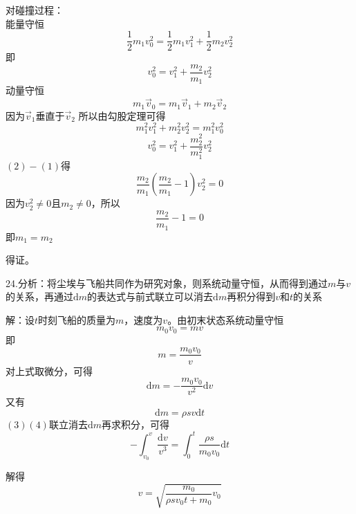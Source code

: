 \documentclass[blue, normal]{./templete/qyxfnote}
\newcommand{\di}[1]{\mathrm{d}#1}
\begin{document}
\begin{multicols}{2}
			对碰撞过程：\\能量守恒
			\begin{equation*}
			\frac{1}{2}m_1v_0^2=\frac{1}{2}m_1v_1^2+\frac{1}{2}m_2v_2^2
			\end{equation*}
			即
			\begin{equation}
			v_0^2=v_1^2+\frac{m_2}{m_1}v_2^2
			\end{equation}
			动量守恒
			\begin{equation*}
			m_1\vec{v}_0=m_1\vec{v}_1+m_2\vec{v}_2
			\end{equation*}
			因为$\vec{v}_1$垂直于$\vec{v}_2$
			所以由勾股定理可得
			\begin{equation*}
			m_1^2 v_1^2 + m_2^2 v_2^2 = m_1^2 v_0^2
			\end{equation*}
			\begin{equation}
			v_0^2=v_1^2+\frac{m_2^2}{m_1^2}v_2^2
			\end{equation}
			$(2)-(1)$得
			\begin{equation*}
			\frac{m_2}{m_1}(\frac{m_2}{m_1}-1)v_2^2=0
			\end{equation*}
			因为$v_2^2 \ne 0$且$m_2 \ne 0$，所以
			\begin{equation*}
			\frac{m_2}{m_1}-1=0
			\end{equation*}
			即$m_1=m_2$
			
			得证。
			
			24.分析：将尘埃与飞船共同作为研究对象，则系统动量守恒，从而得到通过$m$与$v$的关系，再通过$\di m$的表达式与前式联立可以消去$\di m$再积分得到$v$和$t$的关系
			
			解：设$t$时刻飞船的质量为$m$，速度为$v$。由初末状态系统动量守恒
			\begin{equation*}
			m_0 v_0=mv
			\end{equation*}
			即
			\begin{equation*}
			m=\frac{m_0 v_0}{v}
			\end{equation*}
			对上式取微分，可得
			\begin{equation}
			\di m=- \frac{m_0 v_0}{v^2} \di v
			\end{equation}
			又有
			\begin{equation}
			\di m=\rho sv\di t
			\end{equation}
			$(3)(4)$联立消去$\di m$再求积分，可得
			\begin{equation*}
			-\int_{v_0}^v \frac{\di v}{v^3}=\int_0^t \frac{\rho s}{m_0 v_0} \di t
			\end{equation*}
			
			解得
			\begin{equation*}
			v=\sqrt{\frac{m_0}{\rho sv_0 t+m_0}v_0}
			\end{equation*}



\end{multicols}
\end{document}
